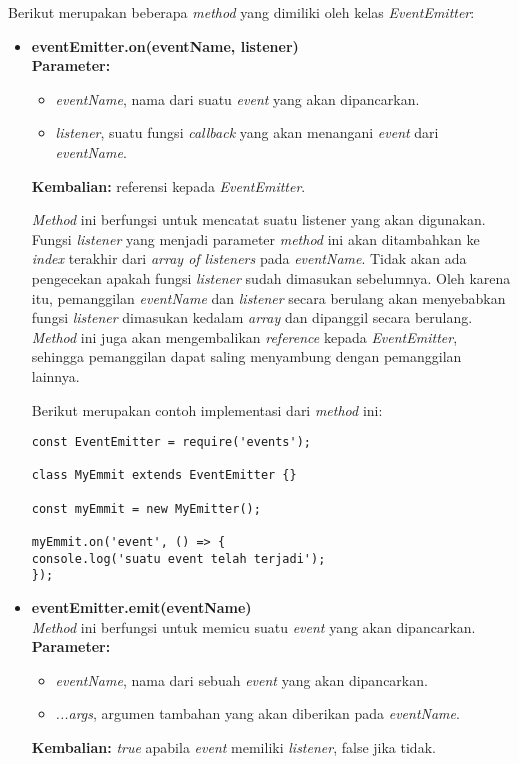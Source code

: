 Berikut merupakan beberapa \textit{method} yang dimiliki oleh kelas \textit{EventEmitter}:

\begin{itemize}
	\item \textbf{eventEmitter.on(eventName, listener)} \\ \textbf{Parameter:}
	\begin{itemize}
		\item \textit{eventName}, nama dari suatu \textit{event} yang akan dipancarkan.
		\item \textit{listener}, suatu fungsi \textit{callback} yang akan menangani \textit{event} dari \textit{eventName}. 
	\end{itemize} 
	\textbf{Kembalian:} referensi kepada \textit{EventEmitter}.
	
	\textit{Method} ini berfungsi untuk mencatat suatu listener yang akan digunakan. Fungsi \textit{listener} yang menjadi parameter \textit{method} ini akan ditambahkan ke \textit{index} terakhir dari \textit{array of listeners} pada \textit{eventName}. Tidak akan ada pengecekan apakah fungsi \textit{listener} sudah dimasukan sebelumnya. Oleh karena itu, pemanggilan \textit{eventName} dan \textit{listener} secara berulang akan menyebabkan fungsi \textit{listener} dimasukan kedalam \textit{array} dan dipanggil secara berulang. \textit{Method} ini juga akan mengembalikan \textit{reference} kepada \textit{EventEmitter}, sehingga pemanggilan dapat saling menyambung dengan pemanggilan lainnya.
	
	Berikut merupakan contoh implementasi dari \textit{method} ini:
\begin{lstlisting}
const EventEmitter = require('events');
	
class MyEmmit extends EventEmitter {}
	
const myEmmit = new MyEmitter();
	
myEmmit.on('event', () => {
console.log('suatu event telah terjadi');	
});
\end{lstlisting}
	
	\item \textbf{eventEmitter.emit(eventName)} \\ \textit{Method} ini berfungsi untuk memicu suatu \textit{event} yang akan dipancarkan. \textbf{Parameter:}
	\begin{itemize}
		\item \textit{eventName}, nama dari sebuah \textit{event} yang akan dipancarkan.
		\item \textit{...args}, argumen tambahan yang akan diberikan pada \textit{eventName}. 
	\end{itemize}
	\textbf{Kembalian:} \textit{true} apabila \textit{event} memiliki \textit{listener}, false jika tidak.
	

\end{itemize}
